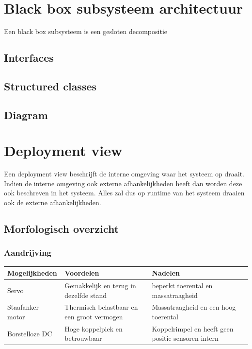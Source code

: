 \documentclass[12pt]{article} %
\begin{document}
\section{Black box subsysteem architectuur}
\label{sec:Black box subsysteem architectuur}
Een black box subsysteem is een gesloten decompositie
\subsection{Interfaces}

\subsection{Structured classes}

\subsection{Diagram}

\newpage%
\section{Deployment view}
\label{sec:Deployment view}
Een deployment view beschrijft de interne omgeving waar het systeem op draait. Indien de interne omgeving ook externe afhankelijkheden heeft dan worden deze ook beschreven in het systeem. Alles zal dus op runtime van het systeem draaien ook de externe afhankelijkheden.

\subsection{Morfologisch overzicht}

\subsubsection{Aandrijving}
\begin{table}[h]
\begin{tabular}{|l|l|l|}
\hline
{\color[HTML]{3166FF} \textbf{Mogelijkheden}} & {\color[HTML]{3166FF} \textbf{Voordelen}} & {\color[HTML]{3166FF} \textbf{Nadelen}} \\ \hline
Servo & Gemakkelijk en terug in dezelfde stand & beperkt toerental en massatraagheid		\\ \hline
Staafanker motor & Thermisch belastbaar en een groot vermogen & Massatraagheid en een hoog toerental	\\ \hline
Borstelloze DC & Hoge koppelpiek en betrouwbaar & Koppelrimpel en heeft geen positie sensoren intern 		\\ \hline
\end{tabular}
\end{table}
\end{document}

